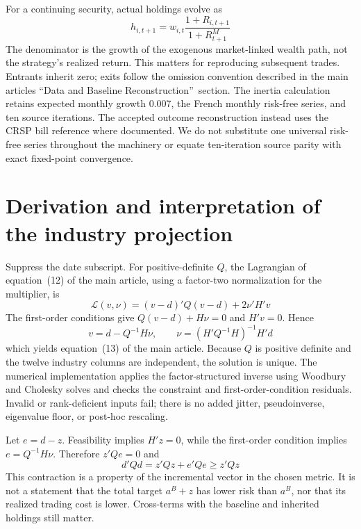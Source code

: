 \documentclass[12pt,letterpaper,fleqn]{article}
\begin{document}
For a continuing security, actual holdings evolve as
\begin{equation}\label{eq:drift}
 h_{i,t+1}=w_{i,t}\frac{1+R_{i,t+1}}{1+R^M_{t+1}}
\end{equation}
The denominator is the growth of the exogenous market-linked wealth path, not the strategy's realized return. This matters for reproducing subsequent trades. Entrants inherit zero; exits follow the omission convention described in the main article\textquotesingle s ``Data and Baseline Reconstruction\textquotedblright\ section. The inertia calculation retains expected monthly growth 0.007, the French monthly risk-free series, and ten source iterations. The accepted outcome reconstruction instead uses the CRSP bill reference where documented. We do not substitute one universal risk-free series throughout the machinery or equate ten-iteration source parity with exact fixed-point convergence.

\section{Derivation and interpretation of the industry projection}\label{app:projection}
Suppress the date subscript. For positive-definite $Q$, the Lagrangian of equation~(12) of the main article, using a factor-two normalization for the multiplier, is
\begin{equation}
 \mathcal L(v,\nu)=(v-d)'Q(v-d)+2\nu'H'v
\end{equation}
The first-order conditions give $Q(v-d)+H\nu=0$ and $H'v=0$. Hence
\begin{equation}
 v=d-Q^{-1}H\nu,\qquad
 \nu=(H'Q^{-1}H)^{-1}H'd
\end{equation}
which yields equation~(13) of the main article. Because $Q$ is positive definite and the twelve industry columns are independent, the solution is unique. The numerical implementation applies the factor-structured inverse using Woodbury and Cholesky solves and checks the constraint and first-order-condition residuals. Invalid or rank-deficient inputs fail; there is no added jitter, pseudoinverse, eigenvalue floor, or post-hoc rescaling.

Let $e=d-z$. Feasibility implies $H'z=0$, while the first-order condition implies $e=Q^{-1}H\nu$. Therefore $z'Qe=0$ and
\begin{equation}
 d'Qd=z'Qz+e'Qe\geq z'Qz
\end{equation}
This contraction is a property of the incremental vector in the chosen metric. It is not a statement that the total target $a^B+z$ has lower risk than $a^B$, nor that its realized trading cost is lower. Cross-terms with the baseline and inherited holdings still matter.
\end{document}
